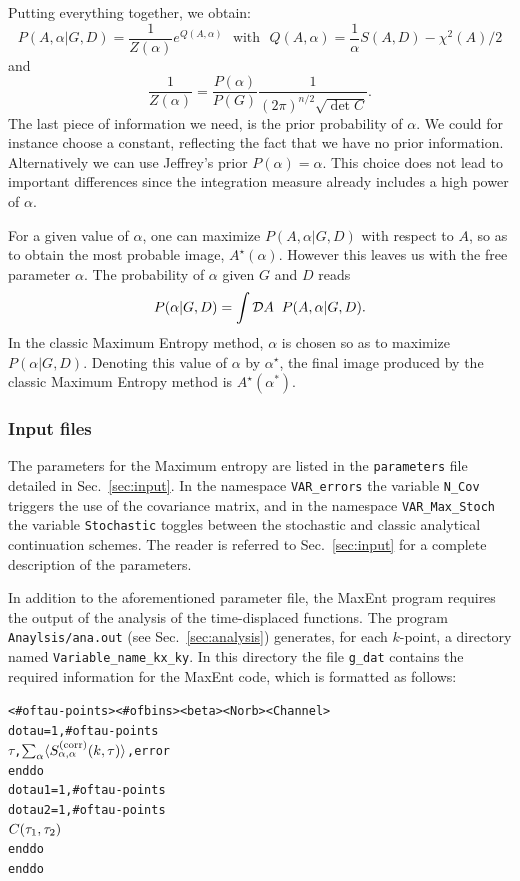Putting   everything  together,  we obtain: 
\begin{equation}
  P(A,\alpha| G, D)    =   \frac{1}{Z(\alpha)} e^{Q(A,\alpha)}       \, \,  \text{ with } \, \, 
      Q(A,\alpha) = \frac{1}{\alpha} S(A,D)  - \chi^{2}(A)/2  
\end{equation}
and  
\begin{equation}
\frac{1}{Z(\alpha)}  = \frac{P(\alpha)}{P(G)}  \frac{1}{(2\pi)^{n/2} \sqrt{\det C }}. 
\end{equation}
The  last  piece  of  information we  need,  is  the prior  probability  of $\alpha$.  We could  for  instance 
choose a  constant,  reflecting the  fact   that we  have  no  prior information.  Alternatively  we  can  use 
Jeffrey's prior $P(\alpha) =   \alpha $.   This  choice  does  not  lead to  important differences  since  the 
integration measure already  includes  a  high  power  of  $\alpha$. 

For a given value of $\alpha$, 
one can maximize  $P(A,\alpha | G, D)  $ with respect to $A$, so as to obtain the
most probable image, $A^{\star}(\alpha)$.   However this leaves us with the free
parameter $\alpha$.    
The probability of $\alpha$  given $ G$  and $D $   reads
\begin{equation}
        P(\alpha| G,D) = \int{\cal D}{A} \; \;  P(A, \alpha | G, D).
\end{equation}
In the classic Maximum Entropy method, $\alpha $ is chosen so as to maximize
$ P(\alpha | G,D) $.  Denoting this value of $\alpha$ by $\alpha^{\star}$,   
the final image produced by the classic Maximum Entropy method is $A^{\star}(\alpha^*)$.

\subsubsection*{Input files} 

The parameters for the  Maximum entropy are  listed in the  \texttt{parameters}  file  detailed in 
Sec.~\ref{sec:input}.  In the namespace   \texttt{VAR\_errors} the  variable  \texttt{N\_Cov} triggers  
the  use  of the covariance  matrix,  and  in the  namespace \texttt{VAR\_Max\_Stoch}   the   variable 
\texttt{Stochastic} toggles  between  the  stochastic  and  classic analytical continuation  schemes.  The 
reader is  referred  to Sec.~\ref{sec:input}  for a  complete  description of the parameters. 


In addition to the aforementioned parameter file, the MaxEnt program requires the output of the  analysis of 
the time-displaced functions. The program \texttt{Anaylsis/ana.out} (see Sec.~\ref{sec:analysis}) generates, 
for each $k$-point, a directory named   \texttt{Variable\_name\_kx\_ky}.  In this directory  
the file \texttt{g\_dat} contains the  required information for the MaxEnt code, which is formatted as follows:
\begin{alltt}
<# of tau-points>  <# of bins >  <beta>  <Norb>  <Channel>
do tau = 1, # of tau-points
   \( \tau\),  \( \sum\sb{\alpha}\langle{S}\sb{\alpha,\alpha}\sp{(\mathrm{corr})}(k,\tau)\rangle\),   error
enddo
do tau1 = 1, # of tau-points
  do tau2 = 1, # of tau-points
     \( C(\tau\sb{1},\tau\sb{2}) \)
  enddo
enddo
\end{alltt}

